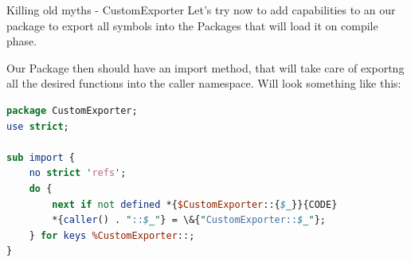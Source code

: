 \documentclass[10pt]{beamer}
\begin{document}
\begin{frame}[fragile]{Killing old myths - CustomExporter}
Let's try now to add capabilities to an our package to export all symbols into the Packages that will load it on compile phase. \\
\pause

Our Package then should have an import method, that will take care of exportng all the desired functions into the caller namespace. Will look something like this:
\begin{lstlisting}[language=perl]
package CustomExporter;
use strict;

sub import {
    no strict 'refs';
    do {
        next if not defined *{$CustomExporter::{$_}}{CODE}              or $_ eq 'import';
        *{caller() . "::$_"} = \&{"CustomExporter::$_"};
    } for keys %CustomExporter::;
}
\end{lstlisting}

\pause


\end{frame}
\end{document}
